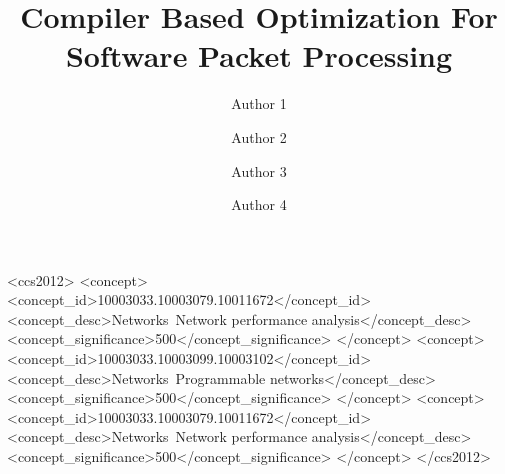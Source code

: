 \documentclass[sigconf]{acmart}
\begin{document}
\title{Compiler Based Optimization For Software Packet Processing}

\author{Author 1}

\author{Author 2}

\author{Author 3}

\author{Author 4}



%
%
\begin{CCSXML}
<ccs2012>
<concept>
<concept_id>10003033.10003079.10011672</concept_id>
<concept_desc>Networks~Network performance analysis</concept_desc>
<concept_significance>500</concept_significance>
</concept>
<concept>
<concept_id>10003033.10003099.10003102</concept_id>
<concept_desc>Networks~Programmable networks</concept_desc>
<concept_significance>500</concept_significance>
</concept>
<concept>
<concept_id>10003033.10003079.10011672</concept_id>
<concept_desc>Networks~Network performance analysis</concept_desc>
<concept_significance>500</concept_significance>
</concept>
</ccs2012>
\end{CCSXML}
\maketitle






\end{document}
